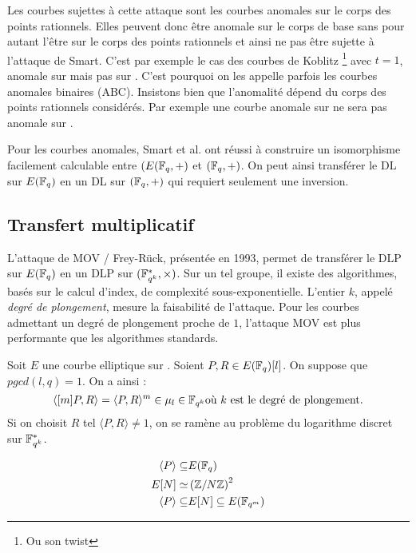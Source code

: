 Les courbes sujettes à cette attaque sont les courbes anomales sur le corps des points rationnels. Elles peuvent donc être anomale sur le corps de base sans pour autant l'être sur le corps des points rationnels et ainsi ne pas être sujette à l'attaque de Smart. C'est par exemple le cas des courbes de Koblitz \footnote{Ou son twist} avec $t = 1$, anomale sur  mais pas sur . C'est pourquoi on les appelle parfois les courbes anomales binaires (ABC). Insistons bien que l'anomalité dépend du corps des points rationnels considérés. Par exemple une courbe anomale sur  ne sera pas anomale sur .

Pour les courbes anomales, Smart et al. ont réussi à construire un isomorphisme facilement calculable entre $(E(\mathbb{F}_{q}, +)$ et $(\mathbb{F}_{q}, +)$. On peut ainsi transférer le DL sur $E(\mathbb{F}_{q})$ en un DL sur $(\mathbb{F}_{q}, +)$ qui requiert seulement une inversion.



\subsection{Transfert multiplicatif}
L'attaque de MOV / Frey-Rück, présentée en 1993, permet de transférer le DLP sur $E(\mathbb{F}_{q})$ en un DLP sur $(\mathbb{F}_{q^k}^{*}, \times)$. Sur un tel groupe, il existe des algorithmes, basés sur le calcul d'index, de complexité sous-exponentielle. L'entier $k$, appelé \emph{degré de plongement}, mesure la faisabilité de l'attaque. Pour les courbes admettant un degré de plongement proche de $1$, l'attaque MOV est plus performante que les algorithmes standards. 

Soit $E$ une courbe elliptique sur . Soient $P, R \in E(\mathbb{F}_{q})[l]$. On suppose que $pgcd(l, q) = 1$. On a ainsi : 
\begin{equation}
\langle [m]P, R \rangle = \langle P, R \rangle^{m} \in \mu_l \in \mathbb{F}_{q^k} \text{où $k$ est le degré de plongement.}
\end{equation}
Si on choisit $R$ tel $\langle P, R \rangle \neq 1$, on se ramène au problème du logarithme discret sur $\mathbb{F}_{q^k}^{*}$. 


\begin{align}
\langle P \rangle \subseteq & E(\mathbb{F}_{q}) \\
E[N] \simeq & \left ( \mathbb{Z}/N\mathbb{Z} \right )^2 \\
\langle P \rangle \subseteq & E[N] \subseteq E(\mathbb{F}_{q^m})
\end{align}

